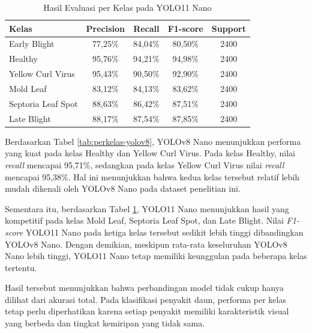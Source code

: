 \begin{sectioncontent}
\begin{subsectioncontent}
        \begin{table}[H]
            \centering
            \caption{Hasil Evaluasi per Kelas pada YOLO11 Nano}
            \label{tab:perkelas-yolo11}
            \small
            \begin{tabular}{|l|c|c|c|c|}
                \hline
                \textbf{Kelas} & \textbf{Precision} & \textbf{Recall} & \textbf{F1-score} & \textbf{Support} \\
                \hline
                Early Blight & 77,25\% & 84,04\% & 80,50\% & 2400 \\
                \hline
                Healthy & 95,76\% & 94,21\% & 94,98\% & 2400 \\
                \hline
                Yellow Curl Virus & 95,43\% & 90,50\% & 92,90\% & 2400 \\
                \hline
                Mold Leaf & 83,12\% & 84,13\% & 83,62\% & 2400 \\
                \hline
                Septoria Leaf Spot & 88,63\% & 86,42\% & 87,51\% & 2400 \\
                \hline
                Late Blight & 88,17\% & 87,54\% & 87,85\% & 2400 \\
                \hline
            \end{tabular}
        \end{table}

        Berdasarkan Tabel \ref{tab:perkelas-yolov8}, YOLOv8 Nano menunjukkan performa yang kuat pada kelas Healthy dan Yellow Curl Virus. Pada kelas Healthy, nilai \textit{recall} mencapai 95,71\%, sedangkan pada kelas Yellow Curl Virus nilai \textit{recall} mencapai 95,38\%. Hal ini menunjukkan bahwa kedua kelas tersebut relatif lebih mudah dikenali oleh YOLOv8 Nano pada dataset penelitian ini.

        Sementara itu, berdasarkan Tabel \ref{tab:perkelas-yolo11}, YOLO11 Nano menunjukkan hasil yang kompetitif pada kelas Mold Leaf, Septoria Leaf Spot, dan Late Blight. Nilai \textit{F1-score} YOLO11 Nano pada ketiga kelas tersebut sedikit lebih tinggi dibandingkan YOLOv8 Nano. Dengan demikian, meskipun rata-rata keseluruhan YOLOv8 Nano lebih tinggi, YOLO11 Nano tetap memiliki keunggulan pada beberapa kelas tertentu.

        Hasil tersebut menunjukkan bahwa perbandingan model tidak cukup hanya dilihat dari akurasi total. Pada klasifikasi penyakit daun, performa per kelas tetap perlu diperhatikan karena setiap penyakit memiliki karakteristik visual yang berbeda dan tingkat kemiripan yang tidak sama.
    \end{subsectioncontent}


\end{sectioncontent}
